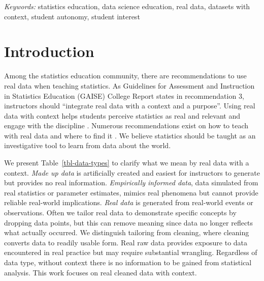 \documentclass[
  12pt]{article}
\begin{document}
\noindent%
{\it Keywords:} statistics education, data science education, real
data, datasets with context, student autonomy, student interest
\vfill

\newpage
{} %

\section{Introduction}\label{sec-introduction}

Among the statistics education community, there are recommendations to
use real data when teaching statistics. As Guidelines for Assessment and
Instruction in Statistics Education (GAISE) College Report
\citeyearpar{gaise2016} states in recommendation 3, instructors should
``integrate real data with a context and a purpose''. Using real data
with context helps students perceive statistics as real and relevant
\citep{neumann2013, bibby2003, brearley2018, cobb1997, cobb1992} and
engage with the discipline \citep{hall2011}. Numerous recommendations
exist on how to teach with real data and where to find it
\citep{hall2011, singer1990}. We believe statistics should be taught as
an investigative tool to learn from data about the world.

We present Table~\ref{tbl-data-types} to clarify what we mean by real
data with a context. \emph{Made up data} is artificially created and
easiest for instructors to generate but provides no real information.
\emph{Empirically informed data}, data simulated from real statistics or
parameter estimates, mimics real phenomena but cannot provide reliable
real-world implications. \emph{Real data} is generated from real-world
events or observations. Often we tailor real data to demonstrate
specific concepts by dropping data points, but this can remove meaning
since data no longer reflects what actually occurred. We distinguish
tailoring from cleaning, where cleaning converts data to readily usable
form. Real raw data provides exposure to data encountered in real
practice but may require substantial wrangling. Regardless of data type,
without context there is no information to be gained from statistical
analysis. This work focuses on real cleaned data with context.
\end{document}
